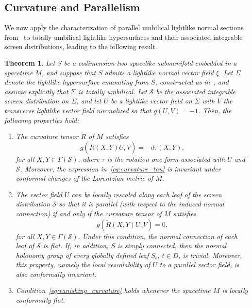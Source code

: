 \documentclass[11pt]{article}
\numberwithin{equation}{section}
\newtheorem{theorem}{Theorem}[section]
\begin{document}
	
\subsection{Curvature and Parallelism}

We now apply the characterization of parallel umbilical lightlike normal sections from~ to totally umbilical lightlike hypersurfaces and their associated integrable screen distributions, leading to the following result.

\begin{theorem}\label{corollary:parallel_normal_connection}
	Let $S$ be a codimension-two spacelike submanifold embedded in a spacetime $M$, and suppose that $S$ admits a lightlike normal vector field $\xi$. Let $\Sigma$ denote the lightlike hypersurface emanating from $S$, constructed as in~, and assume explicitly that $\Sigma$ is totally umbilical. Let $\mathcal{S}$ be the associated integrable screen distribution on $\Sigma$, and let $U$ be a lightlike vector field on $\Sigma$ with $V$ the transverse lightlike vector field normalized so that $g(U,V) = -1$. Then, the following properties hold:
	\begin{enumerate}
		\item[(a)] The curvature tensor $\widetilde{R}$ of $M$ satisfies
		\begin{equation}\label{eq:curvature_tau}
			g(\widetilde{R}(X,Y)U,V) = -d\tau(X,Y),
		\end{equation}
		for all $X, Y \in \Gamma(\mathcal{S})$, where $\tau$ is the rotation one-form associated with $U$ and $\mathcal{S}$. Moreover, the expression in~\eqref{eq:curvature_tau} is invariant under conformal changes of the Lorentzian metric of $M$.
		
		\item[(b)] The vector field $U$ can be locally rescaled along each leaf of the screen distribution $\mathcal{S}$ so that it is parallel (with respect to the induced normal connection) if and only if the curvature tensor of $M$ satisfies
		\begin{equation}\label{eq:vanishing_curvature}
			g(\widetilde{R}(X,Y)U,V) = 0,
		\end{equation}
		for all $X, Y \in \Gamma(\mathcal{S})$. Under this condition, the normal connection of each leaf of $\mathcal{S}$ is flat. If, in addition, $S$ is simply connected, then the normal holonomy group of every globally defined leaf $S_t$, $t\in D$, is trivial. Moreover, this property, namely the local rescalability of $U$ to a parallel vector field, is also conformally invariant.
		
		\item[(c)] Condition~\eqref{eq:vanishing_curvature} holds whenever the spacetime $M$ is locally conformally flat.
	\end{enumerate}
\end{theorem}
\end{document}
